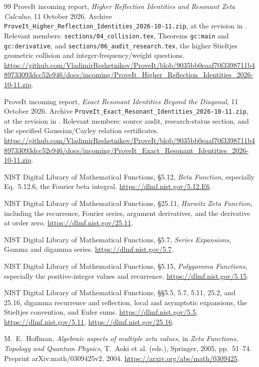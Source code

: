 \documentclass[11pt]{article}
\numberwithin{equation}{section}
\theoremstyle{plain}
\theoremstyle{definition}
\theoremstyle{remark}
\newcommand{\src}[1]{\texttt{\small\nolinkurl{#1}}}
\begin{document}
\begin{thebibliography}{99}
ProveIt incoming report,
\emph{Higher Reflection Identities and Resonant Zeta Calculus},
11 October 2026.
Archive \src{ProveIt_Higher_Reflection_Identities_2026-10-11.zip},
at the revision in \cite{repo:main}.
Relevant members: \src{sections/04_collision.tex}, Theorems
\src{gc:main} and \src{gc:derivative}, and
\src{sections/06_audit_research.tex}, the higher Stieltjes geometric
collision and integer-frequency/weight questions.
\url{https://github.com/VladimirReshetnikov/ProveIt/blob/9035bb0eaaf70f3398711b489733093dcc52e946/docs/incoming/ProveIt_Higher_Reflection_Identities_2026-10-11.zip}.

ProveIt incoming report,
\emph{Exact Resonant Identities Beyond the Diagonal},
11 October 2026.
Archive \src{ProveIt_Exact_Resonant_Identities_2026-10-11.zip},
at the revision in \cite{repo:main}.
Relevant members: source audit, research-status section, and the
specified Gaussian/Cayley relation certificates.
\url{https://github.com/VladimirReshetnikov/ProveIt/blob/9035bb0eaaf70f3398711b489733093dcc52e946/docs/incoming/ProveIt_Exact_Resonant_Identities_2026-10-11.zip}.

NIST Digital Library of Mathematical Functions,
\S5.12, \emph{Beta Function}, especially Eq.~5.12.6,
the Fourier beta integral.
\url{https://dlmf.nist.gov/5.12.E6}.

NIST Digital Library of Mathematical Functions,
\S25.11, \emph{Hurwitz Zeta Function},
including the recurrence, Fourier series, argument derivatives,
and the derivative at order zero.
\url{https://dlmf.nist.gov/25.11}.

NIST Digital Library of Mathematical Functions,
\S5.7, \emph{Series Expansions}, Gamma and digamma series.
\url{https://dlmf.nist.gov/5.7}.

NIST Digital Library of Mathematical Functions,
\S5.15, \emph{Polygamma Functions}, especially the positive-integer
values and recurrence.
\url{https://dlmf.nist.gov/5.15}.

NIST Digital Library of Mathematical Functions,
\S\S5.5, 5.7, 5.11, 25.2, and 25.16,
digamma recurrence and reflection, local and asymptotic expansions,
the Stieltjes convention, and Euler sums.
\url{https://dlmf.nist.gov/5.5},
\url{https://dlmf.nist.gov/5.11},
\url{https://dlmf.nist.gov/25.16}.

M.~E.~Hoffman, \emph{Algebraic aspects of multiple zeta values},
in \emph{Zeta Functions, Topology and Quantum Physics},
T.~Aoki et al. (eds.), Springer, 2005, pp.~51--74.
Preprint arXiv:math/0309425v2, 2004.
\url{https://arxiv.org/abs/math/0309425}.


\end{thebibliography}
\end{document}
